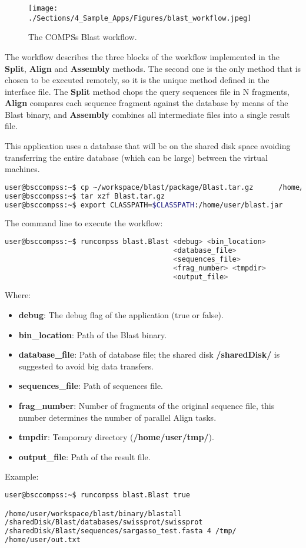 \begin{figure}[ht!]
  \centering
    \texttt{[image: ./Sections/4\_Sample\_Apps/Figures/blast\_workflow.jpeg]}
    \caption{The COMPSs Blast workflow. \label{fig:BLAST_workflow}}
\end{figure}

The workflow describes the three blocks of the workflow implemented in the {\bf Split}, {\bf Align} and 
{\bf Assembly} methods. The second one is the only method that is chosen to be executed remotely, so it 
is the unique method defined in the interface file. The {\bf Split} method chops the query sequences file 
in N fragments, {\bf Align} compares each sequence fragment against the database by means of the Blast 
binary, and {\bf Assembly} combines all intermediate files into a single result file.

This application uses a database that will be on the shared disk space avoiding transferring the entire 
database (which can be large) between the virtual machines.

\begin{lstlisting}[language=bash]
user@bsccompss:~$ cp ~/workspace/blast/package/Blast.tar.gz      /home/user/
user@bsccompss:~$ tar xzf Blast.tar.gz
user@bsccompss:~$ export CLASSPATH=$CLASSPATH:/home/user/blast.jar
\end{lstlisting}

The command line to execute the workflow:

\begin{lstlisting}[language=bash]
user@bsccompss:~$ runcompss blast.Blast <debug> <bin_location>
                                        <database_file> 
                                        <sequences_file>
                                        <frag_number> <tmpdir>
                                        <output_file>
\end{lstlisting}

Where:

\begin{itemize}
 \item {\bf debug}: The debug flag of the application (true or false).
 \item {\bf bin\_location}: Path of the Blast binary.
 \item {\bf database\_file}: Path of database file; the shared disk {\bf /sharedDisk/} is suggested to avoid big data transfers.
 \item {\bf sequences\_file}: Path of sequences file.
 \item {\bf frag\_number}: Number of fragments of the original sequence file, this number determines the number of parallel Align tasks.
 \item {\bf tmpdir}: Temporary directory ({\bf /home/user/tmp/}).
 \item {\bf output\_file}: Path of the result file.
\end{itemize}
 
Example:

\begin{lstlisting}[language=bash]
user@bsccompss:~$ runcompss blast.Blast true

/home/user/workspace/blast/binary/blastall
/sharedDisk/Blast/databases/swissprot/swissprot
/sharedDisk/Blast/sequences/sargasso_test.fasta 4 /tmp/
/home/user/out.txt
\end{lstlisting}